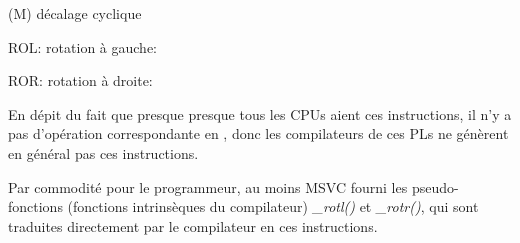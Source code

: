 \label{ROL_ROR}
\item[ROL/ROR] (M) décalage cyclique

ROL: rotation à gauche:



ROR: rotation à droite:



En dépit du fait que presque presque tous les \ac{CPU}s aient ces instructions, il n'y
a pas d'opération correspondante en \CCpp, donc les compilateurs de ces \ac{PL}s
ne génèrent en général pas ces instructions.

Par commodité pour le programmeur, au moins \ac{MSVC} fourni les pseudo-fonctions
(fonctions intrinsèques du compilateur)
\emph{\_rotl()} et \emph{\_rotr()}\FNMSDNROTxURL{},
qui sont traduites directement par le compilateur en ces instructions.

